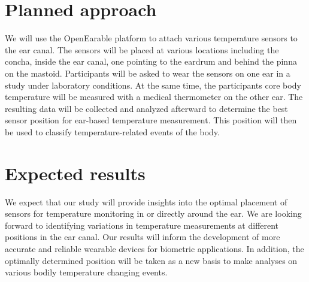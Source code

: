 

\section{Planned approach}
We will use the OpenEarable platform to attach various temperature sensors to the ear canal. 
The sensors will be placed at various locations including the concha, inside the ear canal, one pointing to the eardrum and behind the pinna on the mastoid. 
Participants will be asked to wear the sensors on one ear in a study under laboratory conditions.
At the same time, the participants core body temperature will be measured with a medical thermometer on the other ear.
The resulting data will be collected and analyzed afterward to determine the best sensor position for ear-based temperature measurement. This position will then be used to classify temperature-related events of the body.


\section{Expected results}
We expect that our study will provide insights into the optimal placement of sensors for temperature monitoring in or directly around the ear. We are looking forward to identifying variations in temperature measurements at different positions in the ear canal. Our results will inform the development of more accurate and reliable wearable devices for biometric applications. In addition, the optimally determined position will be taken as a new basis to make analyses on various bodily temperature changing events.

